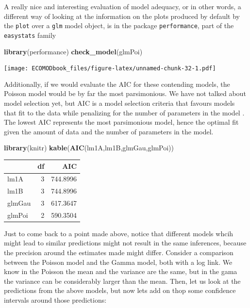 \documentclass[
]{book}
\newenvironment{Shaded}{\begin{snugshade}}{\end{snugshade}}
\newcommand{\FunctionTok}[1]{\textcolor[rgb]{0.13,0.29,0.53}{\textbf{#1}}}
\newcommand{\NormalTok}[1]{#1}
\begin{document}
A really nice and interesting evaluation of model adequacy, or in other words, a different way of looking at the information on the plots produced by default by the \texttt{plot} over a \texttt{glm} model object, is in the package \texttt{performance}, part of the \texttt{easystats} family

\begin{Shaded}
\begin{Highlighting}[]
\FunctionTok{library}\NormalTok{(performance)}
\FunctionTok{check\_model}\NormalTok{(glmPoi)}
\end{Highlighting}
\end{Shaded}

\texttt{[image: ECOMODbook\_files/figure-latex/unnamed-chunk-32-1.pdf]}

Additionally, if we would evaluate the AIC for these contending models, the Poisson model would be by far the most parsimonious. We have not talked about model selection yet, but AIC is a model selection criteria that favours models that fit to the data while penalizing for the number of parameters in the model \citep[e.g.][]{Aho2014}. The lowest AIC represents the most parsimonious model, hence the optimal fit given the amount of data and the number of parameters in the model.

\begin{Shaded}
\begin{Highlighting}[]
\FunctionTok{library}\NormalTok{(knitr)}
\FunctionTok{kable}\NormalTok{(}\FunctionTok{AIC}\NormalTok{(lm1A,lm1B,glmGau,glmPoi))}
\end{Highlighting}
\end{Shaded}

\begin{tabular}{l|r|r}
\hline
  & df & AIC\\
\hline
lm1A & 3 & 744.8996\\
\hline
lm1B & 3 & 744.8996\\
\hline
glmGau & 3 & 617.3647\\
\hline
glmPoi & 2 & 590.3504\\
\hline
\end{tabular}

Just to come back to a point made above, notice that different models whcih might lead to similar predictions might not result in the same inferences, because the precision around the estimates made might differ. Consider a comparison between the Poisson model and the Gamma model, both with a log link. We know in the Poisson the mean and the variance are the same, but in the gama the variance can be considerably larger than the mean. Then, let us look at the predictions from the above models, but now lets add on thop some confidence intervals around those predictions:
\end{document}
